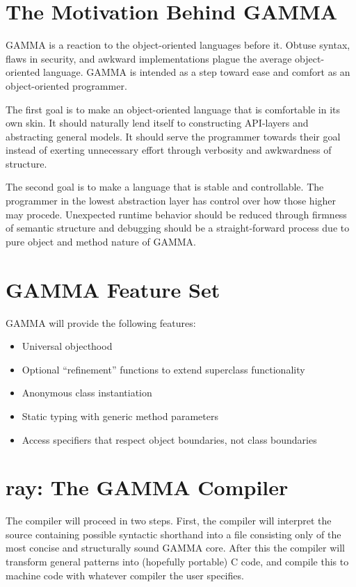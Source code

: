 \documentclass[10pt]{article}
\newcommand{\Lang}{GAMMA}
\newcommand{\Compiler}{ray}
\begin{document}
\section*{ The Motivation Behind \Lang{}}
\Lang{} is a reaction to the object-oriented languages before it.
Obtuse syntax, flaws in security, and awkward implementations plague
the average object-oriented language. \Lang{} is intended as a step
toward ease and comfort as an object-oriented programmer.


The first goal is to make an object-oriented language that is comfortable
in its own skin. It should naturally lend itself to constructing API-layers
and abstracting general models. It should serve the programmer towards their
goal instead of exerting unnecessary effort through verbosity and awkwardness
of structure.


The second goal is to make a language that is stable and controllable.
The programmer in the lowest abstraction layer has control over how those
higher may procede. Unexpected runtime behavior should be reduced through
firmness of semantic structure and debugging should be a straight-forward
process due to pure object and method nature of \Lang{}.

\section*{\Lang{} Feature Set}

\Lang{} will provide the following features:

\begin{itemize}
\item Universal objecthood
\item Optional ``refinement'' functions to extend superclass functionality
\item Anonymous class instantiation
\item Static typing with generic method parameters
\item Access specifiers that respect object boundaries, not class boundaries
\end{itemize}

\section*{\Compiler{}: The \Lang{} Compiler}

The compiler will proceed in two steps. First, the compiler will interpret
the source containing possible syntactic shorthand into a file
consisting only of the most concise and structurally sound GAMMA core. After this the compiler will transform
general patterns into (hopefully portable) C code, and compile this to
machine code with whatever compiler the user specifies.
\end{document}
